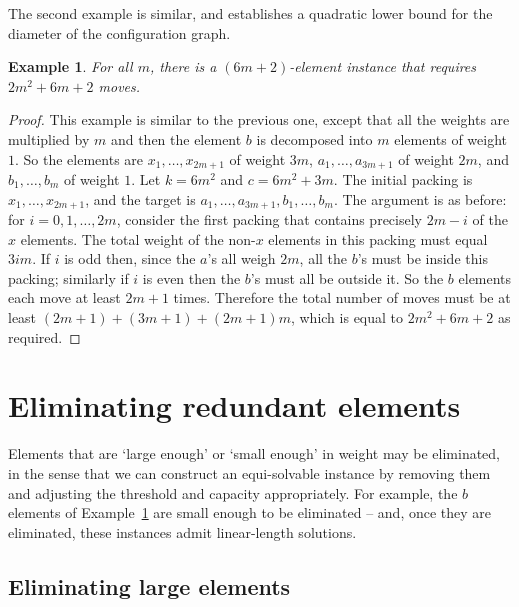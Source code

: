 \documentclass{robinminion}
\newtheorem{eg}[prop]{Example}
\begin{document}
\noindent The second example is similar, and establishes a quadratic lower bound for the diameter of the configuration graph.
\begin{eg}\label{eg:quadratic-bound}
    For all $m$, there is a $(6m+2)$-element instance that requires $2m^2+6m+2$ moves.
\end{eg}
\begin{proof}
    This example is similar to the previous one, except that all the weights are multiplied by $m$ and
    then the element $b$ is decomposed into $m$ elements of weight $1$. So the elements are
    $x_1, \dots, x_{2m+1}$ of weight $3m$,
    $a_1, \dots, a_{3m+1}$ of weight $2m$,
    and $b_1, \dots, b_m$ of weight $1$.
    Let $k=6m^2$ and $c=6m^2+3m$.
    The initial packing is $x_1, \dots, x_{2m+1}$,
    and the target is $a_1, \dots, a_{3m+1}, b_1, \dots, b_m$.
    The argument is as before: for $i=0, 1, \dots, 2m$, consider the first packing that contains precisely $2m-i$ of the $x$ elements. The total weight of the non-$x$ elements in this packing must equal $3im$. If $i$ is odd then, since the $a$'s all weigh $2m$, all the $b$'s must be inside this packing; similarly if $i$ is even then the $b$'s must all be outside it. So the $b$ elements each move at least $2m+1$ times.
    Therefore the total number of moves must be at least $(2m+1) + (3m+1) + (2m+1)m$, which is equal to $2m^2+6m+2$ as required.
\end{proof}

\section*{Eliminating redundant elements}

\noindent Elements that are `large enough' or `small enough' in weight may be eliminated, in the sense that we
can construct an equi-solvable instance by removing them and adjusting the threshold and capacity appropriately.
For example, the $b$ elements of Example~\ref{eg:quadratic-bound} are small enough to be eliminated -- and, once
they are eliminated, these instances admit linear-length solutions.

\subsection*{Eliminating large elements}
\end{document}

